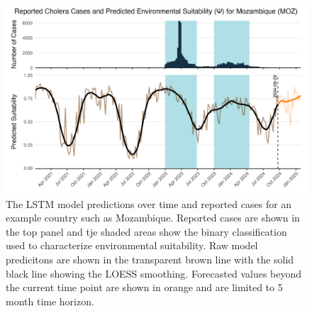 \documentclass[
]{book}
\begin{document}
\begin{figure}

{\centering \includegraphics[width=1\linewidth]{figures/suitability_cases_MOZ} 

}

\caption{The LSTM model predictions over time and reported cases for an example country such as Mozambique. Reported cases are shown in the top panel and tje shaded areas show the binary classification used to characterize environmental suitability. Raw model predicitons are shown in the transparent brown line with the solid black line showing the LOESS smoothing. Forecasted values beyond the current time point are shown in orange and are limited to 5 month time horizon.}\label{fig:psi-prediction-data}
\end{figure}
\end{document}
